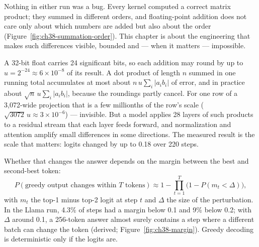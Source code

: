 Nothing in either run was a bug. Every kernel computed a correct matrix
product; they summed in different orders, and floating-point addition does not
care only about which numbers are added but also about the order
(Figure~\ref{fig:ch38-summation-order}). This chapter is about the engineering
that makes such differences visible, bounded and --- when it matters ---
impossible.




A 32-bit float carries 24 significant bits, so each addition may round by up to
$u = 2^{-24} \approx 6 \times 10^{-8}$ of its result. A dot product of length
$n$ summed in one running total accumulates at most about $n\,u \sum_i
\lvert a_i b_i \rvert$ of error, and in practice about $\sqrt{n}\,u \sum_i
\lvert a_i b_i\rvert$, because the roundings partly cancel. For one row of a
3,072-wide projection that is a few millionths of the row's scale
($\sqrt{3072}\,u \approx 3 \times 10^{-6}$) --- invisible. But a model applies 28 layers of such products
to a residual stream that each layer feeds forward, and normalization and
attention amplify small differences in some directions. The measured result is
the scale that matters: logits changed by up to 0.18 over 220 steps.

Whether that changes the answer depends on the margin between the best and
second-best token:
\begin{equation}
P(\text{greedy output changes within } T \text{ tokens}) \approx
1 - \prod_{t=1}^{T} \bigl(1 - P(m_t < \Delta)\bigr),
\label{eq:flip}
\end{equation}
with $m_t$ the top-1 minus top-2 logit at step $t$ and $\Delta$ the size of the
perturbation. In the Llama run, 4.3\% of steps had a margin below 0.1 and 9\% below
0.2; with $\Delta$ around 0.1, a 256-token answer almost surely contains a step
where a different batch can change the token (derived;
Figure~\ref{fig:ch38-margin}). Greedy decoding is deterministic only if the
logits are.

